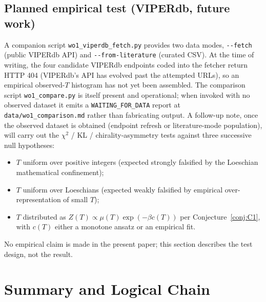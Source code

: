 \documentclass[12pt]{article}
\begin{document}
\subsection{Planned empirical test (VIPERdb, future work)}

A companion script \texttt{wo1\_viperdb\_fetch.py} provides two data
modes, \texttt{-{}-fetch} (public VIPERdb API) and
\texttt{-{}-from-literature} (curated CSV). At the time of writing,
the four candidate VIPERdb endpoints coded into the fetcher return
HTTP 404 (VIPERdb's API has evolved past the attempted URLs), so an
empirical observed-$T$ histogram has not yet been assembled. The
comparison script \texttt{wo1\_compare.py} is itself present and
operational; when invoked with no observed dataset it emits a
\texttt{WAITING\_FOR\_DATA} report at
\texttt{data/wo1\_comparison.md} rather than fabricating output. A
follow-up note, once the observed dataset is obtained (endpoint
refresh or literature-mode population), will carry out the
$\chi^2$ / KL / chirality-asymmetry tests against three successive
null hypotheses:
\begin{itemize}
\item[$H_0$] $T$ uniform over positive integers (expected strongly
falsified by the Loeschian mathematical confinement);
\item[$H_1$] $T$ uniform over Loeschians (expected weakly falsified
by empirical over-representation of small $T$);
\item[$H_2$] $T$ distributed as
$Z(T) \propto \mu(T)\exp(-\beta c(T))$ per Conjecture~\ref{conj:C1},
with $c(T)$ either a monotone ansatz or an empirical fit.
\end{itemize}
No empirical claim is made in the present paper; this section
describes the test design, not the result.

\section{Summary and Logical Chain}\label{sec:chain}
\end{document}
